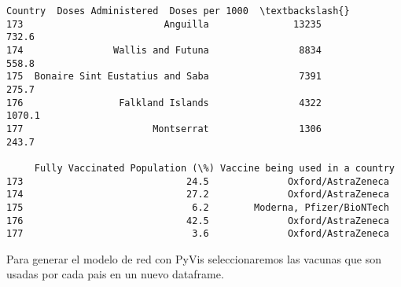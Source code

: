 \documentclass[11pt]{article}
\makeatletter
\newcommand{\boxspacing}{\kern\kvtcb@left@rule\kern\kvtcb@boxsep}
\newcommand{\prompt}[4]{
        {\ttfamily\llap{{\color{#2}[#3]:\hspace{3pt}#4}}\vspace{-\baselineskip}}
    }
\makeatother
\begin{document}
            \begin{tcolorbox}[breakable, size=fbox, boxrule=.5pt, pad at break*=1mm, opacityfill=0]
\prompt{Out}{outcolor}{3}{\boxspacing}
\begin{Verbatim}[commandchars=\\\{\}]
                             Country  Doses Administered  Doses per 1000  \textbackslash{}
173                         Anguilla               13235           732.6
174                Wallis and Futuna                8834           558.8
175  Bonaire Sint Eustatius and Saba                7391           275.7
176                 Falkland Islands                4322          1070.1
177                       Montserrat                1306           243.7

     Fully Vaccinated Population (\%) Vaccine being used in a country
173                             24.5              Oxford/AstraZeneca
174                             27.2              Oxford/AstraZeneca
175                              6.2        Moderna, Pfizer/BioNTech
176                             42.5              Oxford/AstraZeneca
177                              3.6              Oxford/AstraZeneca
\end{Verbatim}
\end{tcolorbox}
        
    Para generar el modelo de red con PyVis seleccionaremos las vacunas que
son usadas por cada pais en un nuevo dataframe.
\end{document}
